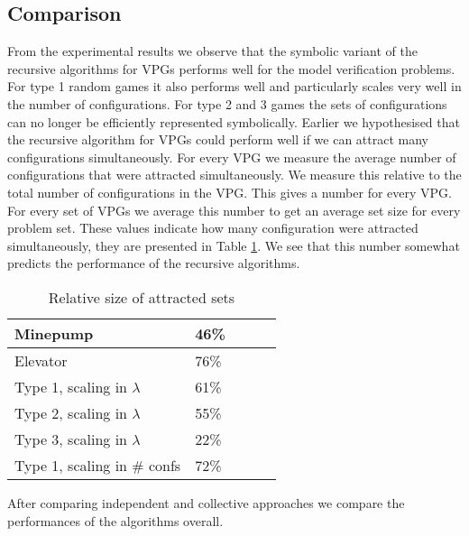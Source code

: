 \subsection{Comparison}
From the experimental results we observe that the symbolic variant of the recursive algorithms for VPGs performs well for the model verification problems. For type 1 random games it also performs well and particularly scales very well in the number of configurations. For type 2 and 3 games the sets of configurations can no longer be efficiently represented symbolically. Earlier we hypothesised that the recursive algorithm for VPGs could perform well if we can attract many configurations simultaneously. For every VPG we measure the average number of configurations that were attracted simultaneously. We measure this relative to the total number of configurations in the VPG. This gives a number for every VPG. For every set of VPGs we average this number to get an average set size for every problem set. These values indicate how many configuration were attracted simultaneously, they are presented in Table \ref{tab_attracted_set_size}. We see that this number somewhat predicts the performance of the recursive algorithms.

\begin{table}[h]
	\centering
	\begin{tabular}{|l|l|l|l|l|}
		\hline
		Minepump& 46\%\\ \hline
		Elevator& 76\%\\ \hline
		Type 1, scaling in $\lambda$& 61\%\\ \hline
		Type 2, scaling in $\lambda$& 55\%\\ \hline
		Type 3, scaling in $\lambda$& 22\%\\ \hline
		Type 1, scaling in \# confs& 72\%\\ \hline
	\end{tabular}
	\caption{Relative size of attracted sets}
	\label{tab_attracted_set_size}
\end{table}

After comparing independent and collective approaches we compare the performances of the algorithms overall.


